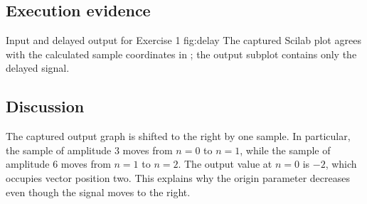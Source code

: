 \subsection{Execution evidence}
  {Input and delayed output for Exercise 1}
  {fig:delay}
The captured Scilab plot agrees with the calculated sample coordinates
in ; the output subplot contains only the delayed signal.

\subsection{Discussion}
The captured output graph is shifted to the right by one sample. In particular,
the sample of amplitude $3$ moves from $n=0$ to $n=1$, while the sample
of amplitude $6$ moves from $n=1$ to $n=2$. The output value at $n=0$ is
$-2$, which occupies vector position two. This explains why the origin
parameter decreases even though the signal moves to the right.
